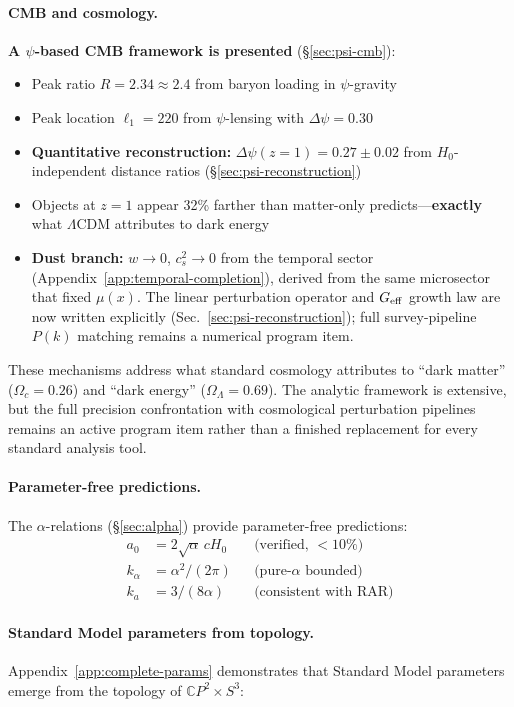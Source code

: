 \paragraph{CMB and cosmology.}
\textbf{A $\psi$-based CMB framework is presented} (\S\ref{sec:psi-cmb}):
\begin{itemize}[nosep]
\item Peak ratio $R = 2.34 \approx 2.4$ from baryon loading in $\psi$-gravity
\item Peak location $\ell_1 = 220$ from $\psi$-lensing with $\Delta\psi = 0.30$
\item \textbf{Quantitative reconstruction:} $\Delta\psi(z=1) = 0.27 \pm 0.02$ from $H_0$-independent distance ratios (\S\ref{sec:psi-reconstruction})
\item Objects at $z=1$ appear 32\% farther than matter-only predicts---\textbf{exactly} what $\Lambda$CDM attributes to dark energy
\item \textbf{Dust branch:} $w \to 0$, $c_s^2 \to 0$ from the temporal sector (Appendix~\ref{app:temporal-completion}), derived from the same microsector that fixed $\mu(x)$. The linear perturbation operator and $G_{\rm eff}$ growth law are now written explicitly (Sec.~\ref{sec:psi-reconstruction}); full survey-pipeline $P(k)$ matching remains a numerical program item.
\end{itemize}
These mechanisms address what standard cosmology attributes to ``dark matter'' ($\Omega_c = 0.26$) and ``dark energy'' ($\Omega_\Lambda = 0.69$). The analytic framework is extensive, but the full precision confrontation with cosmological perturbation pipelines remains an active program item rather than a finished replacement for every standard analysis tool.

\paragraph{Parameter-free predictions.}
The $\alpha$-relations (\S\ref{sec:alpha}) provide parameter-free predictions:
\begin{align}
a_0 &= 2\sqrt{\alpha}\, cH_0 && \text{(verified, ${<}10\%$)} \\
k_\alpha &= \alpha^2/(2\pi) && \text{(pure-$\alpha$ bounded)} \\
k_a &= 3/(8\alpha) && \text{(consistent with RAR)}
\end{align}

\paragraph{Standard Model parameters from topology.}
Appendix~\ref{app:complete-params} demonstrates that Standard Model parameters emerge from the topology of $\mathbb{C}P^2 \times S^3$:

